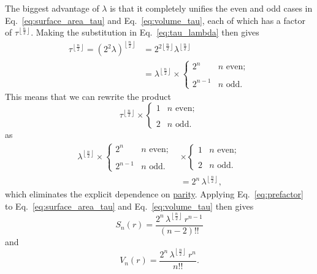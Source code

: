The biggest advantage of $\lambda$ is that it completely unifies the even and odd cases in Eq.~\eqref{eq:surface_area_tau} and Eq.~\eqref{eq:volume_tau}, each of which has a factor of $\tau^{\left\lfloor \frac{n}{2} \right\rfloor}$. Making the substitution in Eq.~\eqref{eq:tau_lambda} then gives
\[
\begin{split}
\tau^{\left\lfloor \frac{n}{2} \right\rfloor} = (2^2\lambda)^{\left\lfloor \frac{n}{2} \right\rfloor} & = 2^{2\left\lfloor \frac{n}{2} \right\rfloor} \lambda^{\left\lfloor \frac{n}{2} \right\rfloor} \\
& = \lambda^{\left\lfloor \frac{n}{2} \right\rfloor}\times
\begin{cases}
 2^n & n \text{ even}; \\ \\
 2^{n-1} & n \text{ odd}.
 \end{cases}
 \end{split}
\]
This means that we can rewrite the product
\[
\tau^{\left\lfloor \frac{n}{2} \right\rfloor}\times \begin{cases}
1 & n \text{ even}; \\ \\
2 & n \text{ odd}.
\end{cases}
\]
as
\begin{equation}
\label{eq:prefactor}
\begin{split}
\lambda^{\left\lfloor \frac{n}{2} \right\rfloor} \times
\begin{cases}
 2^n & n \text{ even}; \\ \\
 2^{n-1} & n \text{ odd}.
 \end{cases}
 & \times
\begin{cases}
 1 & n \text{ even}; \\ \\
 2 & n \text{ odd}.
 \end{cases}
\\ & = 2^n\,\lambda^{\left\lfloor \frac{n}{2} \right\rfloor},
\end{split}
\end{equation}
which eliminates the explicit dependence on \href{https://en.wikipedia.org/wiki/Parity_(mathematics)}{parity}. Applying Eq.~\eqref{eq:prefactor} to \linebreak Eq.~\eqref{eq:surface_area_tau} and Eq.~\eqref{eq:volume_tau} then gives
\begin{equation}
\label{eq:surface_area_lambda}
S_n(r) = \frac{2^n\,\lambda^{\left\lfloor \frac{n}{2} \right\rfloor}\,r^{n-1}}{(n-2)!!}
\end{equation}
and
\begin{equation}
\label{eq:volume_lambda}
V_n(r) = \frac{2^n\,\lambda^{\left\lfloor \frac{n}{2} \right\rfloor}\,r^n}{n!!}.
\end{equation}

